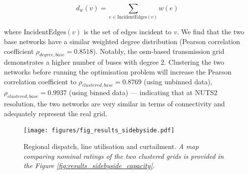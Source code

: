 \documentclass[fleqn,10pt]{wlscirep}
\begin{document}
\begin{equation}
    d_w(v) = \sum_{e \in \text{IncidentEdges}(v)} w(e)
    \label{eq:weighted_degree}
\end{equation}

where \( \text{IncidentEdges}(v) \) is the set of edges incident to \( v \). We find that the two base networks have a similar weighted degree distribution (Pearson correlation coefficient $\rho_{degree,base} = 0.8518$). Notably, the \acrshort{osm}-based transmission grid demonstrates a higher number of buses with degree 2. Clustering the two networks before running the optimisation problem will increase the Pearson correlation coefficient to $\rho_{clustered,base} = 0.8769$ (using unbinned data), $\rho_{clustered,base} = 0.9937$ (using binned data) --- indicating that at NUTS2 resolution, the two networks are very similar in terms of connectivity and adequately represent the real grid.

\begin{figure}[!htbp]
    \centering
    \texttt{[image: figures/fig\_results\_sidebyside.pdf]}
    \caption{Regional dispatch, line utilisation and curtailment. \textit{A map comparing nominal ratings of the two clustered grids is provided in the Figure \ref{fig:results_sidebyside_capacity}.}}
    \label{fig:results_sidebyside}
\end{figure}
\end{document}
